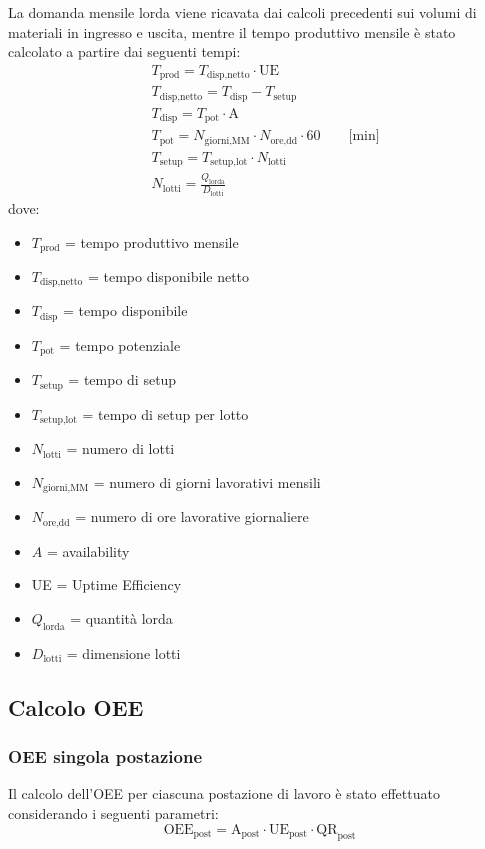 \documentclass[11pt]{article}
\begin{document}
La domanda mensile lorda viene ricavata dai calcoli precedenti sui volumi di materiali in ingresso e uscita, mentre il tempo produttivo mensile è stato calcolato a partire dai seguenti tempi:
\begin{align}
    & T_\text{prod} = T_\text{disp,netto} \cdot \text{UE} \\
    & T_\text{disp,netto} = T_\text{disp}- T_\text{setup} \\
    & T_\text{disp} = T_\text{pot} \cdot \text{A} \\
    & T_\text{pot} = N_\text{giorni,MM} \cdot N_\text{ore,dd} \cdot 60 \qquad \text{[min]} \\
    & T_\text{setup} = T_\text{setup,lot} \cdot N_\text{lotti} \\
    & N_\text{lotti} = \frac{Q_\text{lorda}}{D_\text{lotti}}
\end{align}
dove:
\begin{itemize}
    \item $T_\text{prod}$ = tempo produttivo mensile
    \item $T_\text{disp,netto}$ = tempo disponibile netto
    \item $T_\text{disp}$ = tempo disponibile
    \item $T_\text{pot}$ = tempo potenziale
    \item $T_\text{setup}$ = tempo di setup
    \item $T_\text{setup,lot}$ = tempo di setup per lotto
    \item $N_\text{lotti}$ = numero di lotti
    \item $N_\text{giorni,MM}$ = numero di giorni lavorativi mensili
    \item $N_\text{ore,dd}$ = numero di ore lavorative giornaliere
    \item $A$ = availability
    \item UE = Uptime Efficiency
    \item $Q_\text{lorda}$ = quantità lorda
    \item $D_\text{lotti}$ = dimensione lotti
\end{itemize}

\subsection{Calcolo OEE}
\subsubsection{OEE singola postazione}
Il calcolo dell'OEE per ciascuna postazione di lavoro è stato effettuato considerando i seguenti parametri:
\begin{equation}
    \text{OEE}_\text{post} = \text{A}_\text{post} \cdot \text{UE}_\text{post} \cdot \text{QR}_\text{post}
\end{equation}
\end{document}
